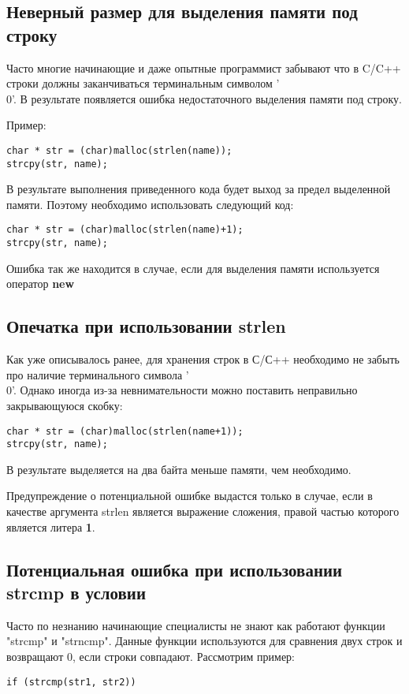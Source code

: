 \subsection{Неверный размер для выделения памяти под строку}
\label{sec:allocStr}
Часто многие начинающие и даже опытные программист забывают что в C/C++ строки должны заканчиваться
терминальным символом '\\0'. В результате появляется ошибка недостаточного выделения памяти под строку.

Пример:
\begin{lstlisting}
char * str = (char)malloc(strlen(name));
strcpy(str, name);
\end{lstlisting}

В результате выполнения приведенного кода будет выход за предел выделенной памяти. Поэтому необходимо
использовать следующий код:
\begin{lstlisting}
char * str = (char)malloc(strlen(name)+1);
strcpy(str, name);
\end{lstlisting}

Ошибка так же находится в случае, если для выделения памяти используется оператор \textbf{new}

\subsection{Опечатка при использовании strlen}
\label{sec:strlen}
Как уже описывалось ранее, для хранения строк в С/С++ необходимо не забыть про наличие терминального
символа '\\0'. Однако иногда из-за невнимательности можно поставить неправильно закрывающуюся скобку:
\begin{lstlisting}
char * str = (char)malloc(strlen(name+1));
strcpy(str, name);
\end{lstlisting}

В результате выделяется на два байта меньше памяти, чем необходимо. 

Предупреждение о потенциальной ошибке выдастся только в случае, если в качестве аргумента
strlen является выражение сложения, правой частью которого является литера \textbf{1}.

\subsection{Потенциальная ошибка при использовании strcmp в условии}
\label{sec:strcmp}
Часто по незнанию начинающие специалисты не знают как работают функции "strcmp" и "strncmp".
Данные функции используются для сравнения двух строк и возвращают 0, если строки совпадают.
Рассмотрим пример:
\begin{lstlisting}
if (strcmp(str1, str2))
\end{lstlisting}
 
